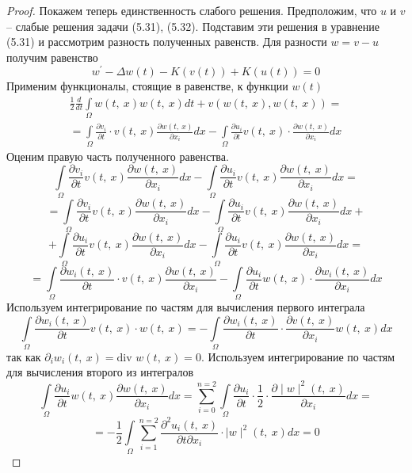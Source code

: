 \begin{proof}
    Покажем теперь единственность слабого решения. Предположим, что $u$ и $v$ -- слабые решения задачи (5.31), (5.32).
    Подставим эти решения в уравнение (5.31) и рассмотрим разность полученных равенств. Для разности $w = v - u$ получим равенство
    $$w^\prime - \Delta w(t) - K(v(t)) + K(u(t)) = 0$$
    Применим функционалы, стоящие в равенстве, к функции $w(t)$
    \begin{equation}\label{eq:5.36}
        \begin{gathered}
            \frac{1}{2}\frac{d}{dt}\int\limits_\Omega w(t, \ x)w(t, \ x)dt+v(w(t, \ x),w(t, \ x))= \\
            =\int\limits_\Omega\frac{\partial v_i}{\partial t}\cdot v(t, \ x)\frac{\partial w(t, \ x)}{\partial x_i}dx-\int\limits_\Omega\frac{\partial u_i}{\partial t}v(t, \ x)\cdot\frac{\partial w(t, \ x)}{\partial x_i}dx
        \end{gathered}
    \end{equation}
    Оценим правую часть полученного равенства.
    $$\int\limits_\Omega\frac{\partial v_i}{\partial t}v(t, \ x)\frac{\partial w(t, \ x)}
    {\partial x_i}dx-\int\limits_\Omega\frac{\partial u_i}{\partial t}v(t, \ x)\frac{\partial w(t, \ x)}{\partial x_i}dx=$$
    $$=\int\limits_\Omega\frac{\partial v_i}{\partial t}v(t, \ x)\frac{\partial w(t, \ x)}
    {\partial x_i}dx-\int\limits_\Omega\frac{\partial u_i}{\partial t}v(t, \ x)\frac{\partial w(t, \ x)}{\partial x_i}dx+$$
    $$+\int\limits_\Omega\frac{\partial u_i}{\partial t}v(t, \ x)\frac{\partial w(t, \ x)}
    {\partial x_i}dx-\int\limits_\Omega\frac{\partial u_i}{\partial t}v(t, \ x)\frac{\partial w(t, \ x)}{\partial x_i}dx=$$
    $$=\int\limits_\Omega\frac{\partial w_i(t, \ x)}{\partial t}\cdot v(t, \ x)\frac{\partial w(t, \ x)}
    {\partial x_i}-\int\limits_\Omega\frac{\partial u_i}{\partial t}w(t, \ x)\cdot\frac{\partial w_i(t, \ x)}{\partial x_i}dx$$
    Используем интегрирование по частям для вычисления первого интеграла
    $$\int\limits_\Omega\frac{\partial w_i(t, \ x)}{\partial t}v(t, \ x)\cdot w(t, \ x)=
    -\int\limits_\Omega\frac{\partial w_i(t, \ x)}{\partial t}\cdot\frac{\partial v(t, \ x)}{\partial x_i}w(t, \ x)dx$$
    так как $\partial_iw_i(t, \ x) = \textrm{div } w(t, \ x)=0$. Используем интегрирование по частям для вычисления второго из интегралов
    $$\int\limits_\Omega\frac{\partial u_i}{\partial t}w(t, \ x)\frac{\partial w(t, \ x)}{\partial x_i}dx=
    \sum_{i=0}^{n=2}\int\limits_\Omega\frac{\partial u_i}{\partial t}\cdot\frac{1}{2}\cdot\frac{\partial \mid w\mid^2(t, \ x)}{\partial x_i}dx=$$
    $$=-\frac{1}{2}\int\limits_\Omega\sum_{i=1}^{n=2}\frac{\partial^2 u_i(t, \ x)}{\partial t\partial x_i}\cdot\mid w\mid^2(t, \ x)dx=0$$

\end{proof}
